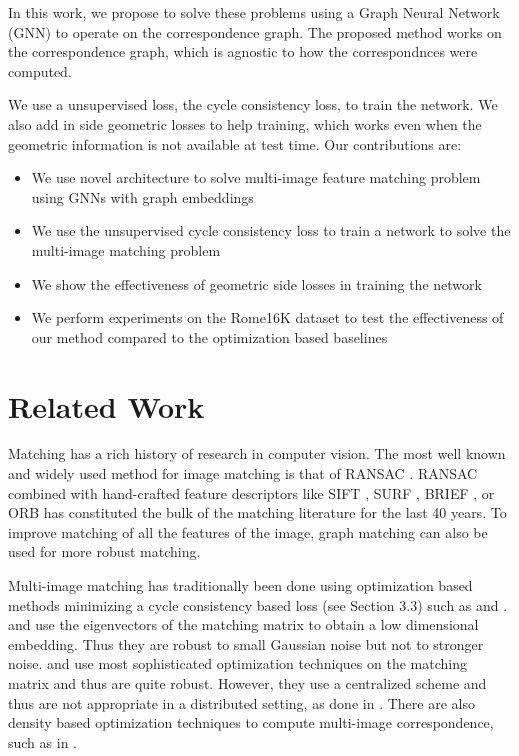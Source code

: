 \documentclass[10pt,twocolumn,letterpaper]{article}
\begin{document}
In this work, we propose to solve these problems using a Graph Neural Network (GNN) to operate on the correspondence graph.
The proposed method works on the correspondence graph, which is agnostic to how the correspondnces were computed.

We use a unsupervised loss, the cycle consistency loss, to train the network.
We also add in side geometric losses to help training, which works even when the geometric information is not available at test time.
Our contributions are:
\begin{itemize}
\item We use novel architecture to solve multi-image feature matching problem using GNNs with graph embeddings
\item We use the unsupervised cycle consistency loss to train a network to solve the multi-image matching problem
\item We show the effectiveness of geometric side losses in training the network
\item We perform experiments on the Rome16K \cite{li2010location} dataset to test the effectiveness of our method compared to the optimization based baselines
\end{itemize}


\section{Related Work}

Matching has a rich history of research in computer vision.
The most well known and widely used method for image matching is that of RANSAC \cite{fischler1981random}.
RANSAC combined with hand-crafted feature descriptors like SIFT \cite{lowe2004distinctive}, SURF \cite{bay2006surf}, BRIEF \cite{calonder2012brief}, or ORB \cite{mur2015orb} has constituted the bulk of the matching literature for the last 40 years.
To improve matching of all the features of the image, graph matching \cite{suh2015subgraph, hu2016distributable} can also be used for more robust matching.

Multi-image matching has traditionally been done using optimization based methods minimizing a cycle consistency based loss (see Section 3.3) such as \cite{pachauri2013solving,zhou2015multi,arrigoni2017synchronization} and \cite{wang2017multi}.
\cite{pachauri2013solving} and \cite{arrigoni2017synchronization} use the eigenvectors of the matching matrix to obtain a low dimensional embedding. 
Thus they are robust to small Gaussian noise but not to stronger noise.
\cite{zhou2015multi} and \cite{wang2017multi} use most sophisticated optimization techniques on the matching matrix and thus are quite robust.
However, they use a centralized scheme and thus are not appropriate in a distributed setting, as done in \cite{leonardos2016distributed}.
There are also density based optimization techniques to compute multi-image correspondence, such as in \cite{tron2017fast}.
\end{document}
